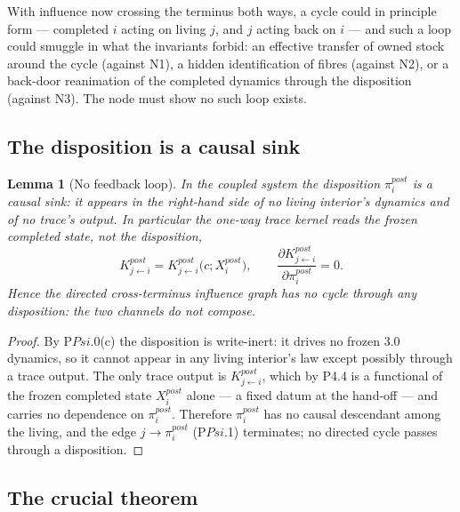 \documentclass[11pt,a4paper]{article}
\newcommand{\cint}{\ensuremath{\mathfrak c}}
\def\Psi{Psi}%
\def\mathfrak#1{#1}%
\def\mathrm#1{#1}%
\def\emph#1{#1}%
\theoremstyle{definition}
\theoremstyle{plain}
\newtheorem{lemma}[definition]{Lemma}
\theoremstyle{remark}
\begin{document}
With influence now crossing the terminus both ways, a cycle could in principle form ---
completed \(i\) acting on living \(j\), and \(j\) acting back on \(i\) --- and such a loop could
smuggle in what the invariants forbid: an effective transfer of owned stock around the cycle
(against N1), a hidden identification of fibres (against N2), or a back-door reanimation of the
completed dynamics through the disposition (against N3). The node must show no such loop exists.

\subsection{The disposition is a causal sink}

\begin{lemma}[No feedback loop]\label{lem:noloop}
In the coupled system the disposition \(\pi_i^{\mathrm{post}}\) is a causal sink: it appears in
the right-hand side of no living interior's dynamics and of no trace's output. In particular
the one-way trace kernel reads the \emph{frozen} completed state, not the disposition,
\[
K^{\mathrm{post}}_{j\leftarrow i}=K^{\mathrm{post}}_{j\leftarrow i}\bigl(\cint;X_i^{\mathrm{post}}\bigr),
\qquad
\frac{\partial K^{\mathrm{post}}_{j\leftarrow i}}{\partial \pi_i^{\mathrm{post}}}=0 .
\]
Hence the directed cross-terminus influence graph has no cycle through any disposition: the two
channels do not compose.
\end{lemma}

\begin{proof}
By P$\Psi$.0(c) the disposition is write-inert: it drives no frozen 3.0 dynamics, so it cannot
appear in any living interior's law except possibly through a trace output. The only trace
output is \(K^{\mathrm{post}}_{j\leftarrow i}\), which by P4.4 is a functional of the frozen
completed state \(X_i^{\mathrm{post}}\) alone --- a fixed datum at the hand-off --- and carries
no dependence on \(\pi_i^{\mathrm{post}}\). Therefore \(\pi_i^{\mathrm{post}}\) has no causal
descendant among the living, and the edge \(j\to\pi_i^{\mathrm{post}}\) (P$\Psi$.1) terminates;
no directed cycle passes through a disposition. \qedhere
\end{proof}

\subsection{The crucial theorem}
\end{document}
